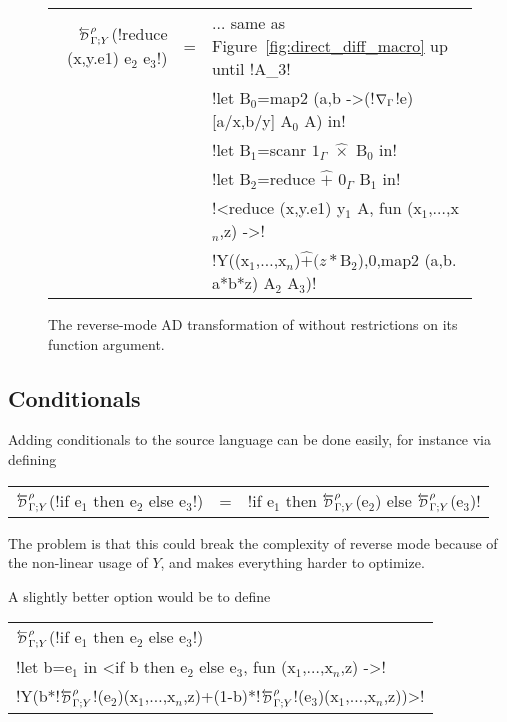 \begin{figure}

\begin{small}
\begin{tabular}{|r c l|}
\hline
$\directD{\rho}{\Gamma}{Y}$(!reduce (x,y.e1) e$_2$ e$_3$!) 
&=& $\ldots$ same as Figure~\ref{fig:direct_diff_macro} up until !A_$3$! \\
&& !let B$_0$=map2 (a,b ->(!$\nabla_\Gamma$!e)[a/x,b/y] A$_0$ A) in!\\
&& !let B$_1$=scanr $1_\Gamma$ $\widehat{\times}$ B$_0$ in! \\
&& !let B$_2$=reduce $\widehat{+}$ $0_\Gamma$ B$_1$ in! \\
&& !<reduce (x,y.e1) y$_1$ A, fun (x$_1$,$\ldots$,x$_n$,z) ->! \\
&& !Y((x$_1$,$\ldots$,x$_n$)$\widehat{+}(z*$B$_2$),0,map2 (a,b. a*b*z) A$_2$ A$_3$)! \\ \hline
\end{tabular}
\end{small}
\vspace{-0.4cm}
\caption{The reverse-mode AD transformation of  without restrictions on its function argument.}
\vspace{-0.4cm}
\label{fig:lift_reduce}
\end{figure}

\subsection{Conditionals} %
\label{sub:lift_conditional}

Adding conditionals to the source language can be done easily, for instance via defining

\begin{tabular}{r c l}
$\directD{\rho}{\Gamma}{Y}$(!if e$_1$ then e$_2$ else e$_3$!) &=& !if e$_1$ then $\directD{\rho}{\Gamma}{Y}$(e$_2$) else $\directD{\rho}{\Gamma}{Y}$(e$_3$)! 
\end{tabular}

The problem is that this could break the complexity of reverse mode because of the non-linear usage of $Y$, and makes everything harder to optimize.

A slightly better option would be to define 

\begin{tabular}{l}
    $\directD{\rho}{\Gamma}{Y}$(!if e$_1$ then e$_2$ else e$_3$!) \\
    !let b=e$_1$ in <if b then e$_2$ else e$_3$, fun (x$_1$,$\ldots$,x$_n$,z) ->! \\
    !Y(b*!$\directD{\rho}{\Gamma}{Y}$!(e$_2$)(x$_1$,$\ldots$,x$_n$,z)+(1-b)*!$\directD{\rho}{\Gamma}{Y}$!(e$_3$)(x$_1$,$\ldots$,x$_n$,z))>!
\end{tabular}

